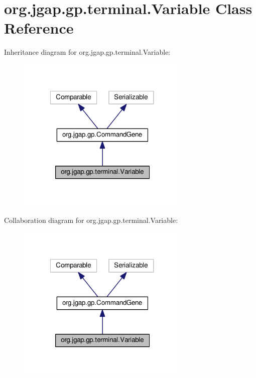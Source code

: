 \hypertarget{classorg_1_1jgap_1_1gp_1_1terminal_1_1_variable}{\section{org.\-jgap.\-gp.\-terminal.\-Variable Class Reference}
\label{classorg_1_1jgap_1_1gp_1_1terminal_1_1_variable}
}


Inheritance diagram for org.\-jgap.\-gp.\-terminal.\-Variable\-:
\nopagebreak
\begin{figure}[H]
\begin{center}
\leavevmode
\includegraphics[width=233pt]{classorg_1_1jgap_1_1gp_1_1terminal_1_1_variable__inherit__graph}
\end{center}
\end{figure}


Collaboration diagram for org.\-jgap.\-gp.\-terminal.\-Variable\-:
\nopagebreak
\begin{figure}[H]
\begin{center}
\leavevmode
\includegraphics[width=233pt]{classorg_1_1jgap_1_1gp_1_1terminal_1_1_variable__coll__graph}
\end{center}
\end{figure}
